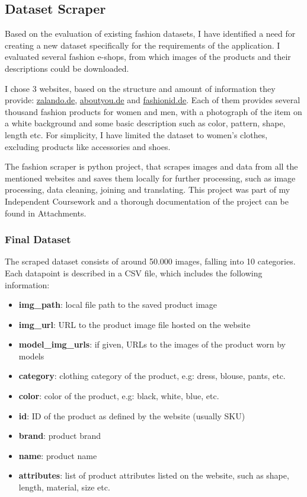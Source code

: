 \documentclass{article}
\begin{document}
\subsection{Dataset Scraper}
Based on the evaluation of existing fashion datasets, I have identified a need for creating a new dataset specifically for the requirements of the application. I evaluated several fashion e-shops, from which images of the products and their descriptions could be downloaded. 

I chose 3 websites, based on the structure and amount of information they provide: \href{https://www.zalando.de/damen-home/}{zalando.de}, \href{https://www.aboutyou.de/}{aboutyou.de} and \href{https://www.fashionid.de/damen/}{fashionid.de}. Each of them provides several thousand fashion products for women and men, with a photograph of the item on a white background and some basic description such as color, pattern, shape, length etc. For simplicity, I have limited the dataset to women's clothes, excluding products like accessories and shoes.

The fashion scraper is python project, that scrapes images and data from all the mentioned websites and saves them locally for further processing, such as image processing, data cleaning, joining and translating. This project was part of my Independent Coursework and a thorough documentation of the project can be found in Attachments.

\subsubsection{Final Dataset}
The scraped dataset consists of around 50.000 images, falling into 10 categories. 
Each datapoint is described in a CSV file, which includes the following information:

\begin{itemize}
\item \textbf{img\_path}: local file path to the saved product image
\item \textbf{img\_url}: URL to the product image file hosted on the website
\item \textbf{model\_img\_urls}: if given, URLs to the images of the product worn by models
\item \textbf{category}: clothing category of the product, e.g: dress, blouse, pants, etc.
\item \textbf{color}: color of the product, e.g: black, white, blue, etc.
\item \textbf{id}: ID of the product as defined by the website (usually SKU)
\item \textbf{brand}: product brand
\item \textbf{name}: product name
\item \textbf{attributes}: list of product attributes listed on the website, such as shape, length, material, size etc.
\end{itemize}
\end{document}
